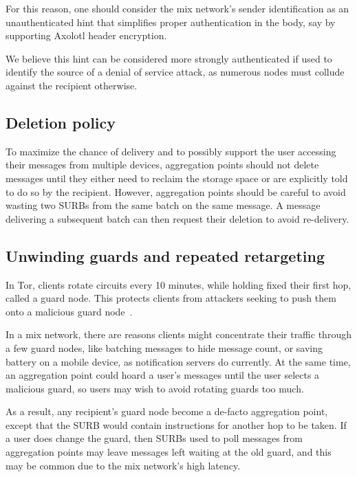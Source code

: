 \documentclass[twoside,letterpaper]{llncs}
\begin{document}
For this reason, one should consider the mix network's sender identification
as an unauthenticated hint that simplifies proper authentication in
the body, say by supporting Axolotl header encryption.

We believe this hint can be considered more strongly authenticated
if used to identify the source of a denial of service attack, as
numerous nodes must collude against the recipient otherwise.


\subsection{Deletion policy}

To maximize the chance of delivery and to possibly support the user
accessing their messages from multiple devices, aggregation points
should not delete messages until they either need to reclaim the
storage space or are explicitly told to do so by the recipient.
However, aggregation points should be careful to avoid wasting two
SURBs from the same batch on the same message.  A message delivering a
subsequent batch can then request their deletion to avoid re-delivery.


\subsection{Unwinding guards and repeated retargeting}

In Tor, clients rotate circuits every 10 minutes, while holding
fixed their first hop, called a guard node.  This protects clients
from attackers seeking to push them onto a malicious guard
node~\cite{tor-guards}.

In a mix network, there are reasons clients might concentrate their
traffic through a few guard nodes, like batching messages to hide
message count, or saving battery on a mobile device, as notification
servers do currently.  At the same time, an aggregation point could
hoard a user's messages until the user selects a malicious guard,
so users may wish to avoid rotating guards too much.

As a result, any recipient's guard node become a de-facto aggregation
point, except that the SURB would contain instructions for another hop
to be taken.  If a user does change the guard, then SURBs used to poll
messages from aggregation points may leave messages left waiting at
the old guard, and this may be common due to the mix network's
high latency.
\end{document}
